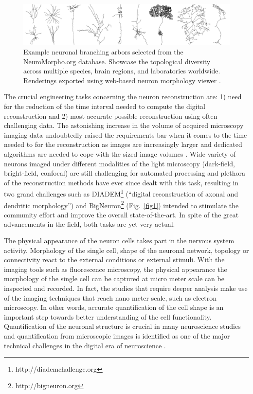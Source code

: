 \begin{figure}[t!]
	\begin{center}
		\includegraphics[width=\textwidth]{fig2}
	\end{center}
	\caption{Example neuronal branching arbors selected from the NeuroMorpho.org database. Showcase the topological diversity across multiple species, brain regions, and laboratories worldwide. Renderings exported using web-based neuron morphology viewer \cite{bakker2016web}.}
	\label{fig2}
\end{figure}

The crucial engineering tasks concerning the neuron reconstruction are: 1) need for the reduction of the time interval needed to compute the digital reconstruction and 2) most accurate possible reconstruction using often challenging data. The astonishing increase in the volume of acquired microscopy imaging data \cite{meijering2016imagining} undoubtedly raised the requirements bar when it comes to the time needed to for the reconstruction as images are increasingly larger and dedicated algorithms are needed to cope with the sized image volumes \cite{peng2017automatic}. Wide variety of neurons imaged under different modalities of the light microscopy (dark-field, bright-field, confocal) are still challenging for automated processing \cite{svoboda2011past, peng2011proof} and plethora of the reconstruction methods \cite{peng2011automatic} have ever since dealt with this task, resulting in two grand challenges such as DIADEM\footnote{http://diademchallenge.org} (``digital reconstruction of axonal and dendritic morphology'') and BigNeuron\footnote{http://bigneuron.org} \cite{peng2015diadem, peng2015bigneuron, gillette2011diademchallenge} (Fig.~\ref{fig1}) intended to stimulate the community effort and improve the overall state-of-the-art. In spite of the great advancements in the field, both tasks are yet very actual.

The physical appearance of the neuron cells takes part in the nervous system activity. Morphology of the single cell, shape of the neuronal network, topology or connectivity react to the external conditions or external stimuli. With the imaging tools such as fluorescence microscopy, the physical appearance the morphology of the single cell can be captured at micro meter scale can be inspected and recorded. In fact, the studies that require deeper analysis make use of the imaging techniques that reach nano meter scale, such as electron microscopy. In other words, accurate quantification of the cell shape is an important step towards better understanding of the cell functionality. Quantification of the neuronal structure is crucial in many neuroscience studies \cite{halavi2012digital} and quantification from microscopic images is identified as one of the major technical challenges in the digital era of neuroscience \cite{peng2015diadem}.

